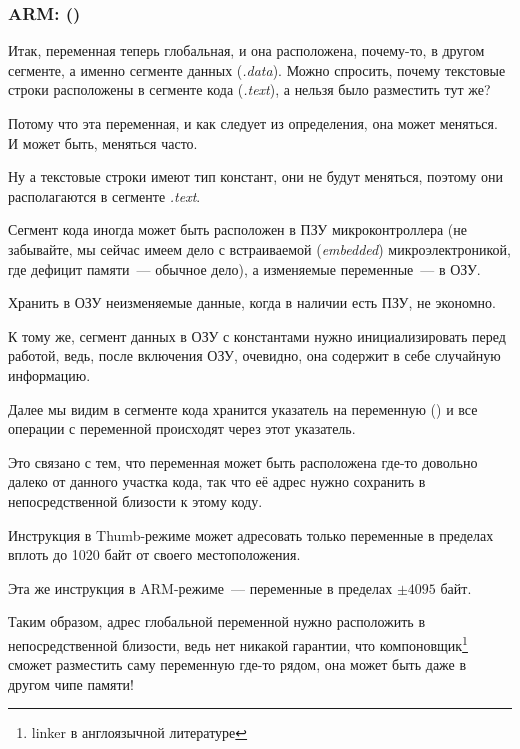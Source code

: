 \subsubsection{ARM: \OptimizingKeilVI (\ThumbMode)}



Итак, переменная  теперь глобальная, и она расположена, почему-то, в другом сегменте, а именно сегменте данных (\emph{.data}).
Можно спросить, почему текстовые строки расположены в сегменте кода (\emph{.text}), а  нельзя было разместить тут же?

Потому что эта переменная, и как следует из определения, она может меняться. И может быть, меняться часто.

Ну а текстовые строки имеют тип констант, они не будут меняться, поэтому они располагаются в сегменте \emph{.text}.

\myindex{\RAM}
\myindex{\ROM}
Сегмент кода иногда может быть расположен в ПЗУ микроконтроллера (не забывайте, 
мы сейчас имеем дело с встраиваемой (\emph{embedded}) микроэлектроникой,
где дефицит памяти~--- обычное дело),
а изменяемые переменные~--- в ОЗУ.

Хранить в ОЗУ неизменяемые данные, когда в наличии есть ПЗУ, не экономно.

К тому же, сегмент данных в ОЗУ с константами нужно инициализировать перед работой,
ведь, после включения ОЗУ, очевидно, она содержит в себе случайную информацию.

Далее мы видим в сегменте кода хранится указатель на переменную  () и 
все операции с переменной происходят через этот указатель.

Это связано с тем, что переменная  может быть расположена где-то довольно далеко от 
данного участка кода, так что её адрес нужно сохранить в непосредственной близости к этому коду.

Инструкция  в Thumb-режиме может адресовать только переменные в пределах вплоть до 1020 байт от своего местоположения.

Эта же инструкция в ARM-режиме~--- переменные в пределах $\pm{}4095$ байт.

Таким образом,
адрес глобальной переменной  нужно расположить в непосредственной близости, ведь нет никакой гарантии, 
что компоновщик\footnote{linker в англоязычной литературе} сможет разместить саму переменную где-то рядом, 
она может быть даже в другом чипе памяти!

